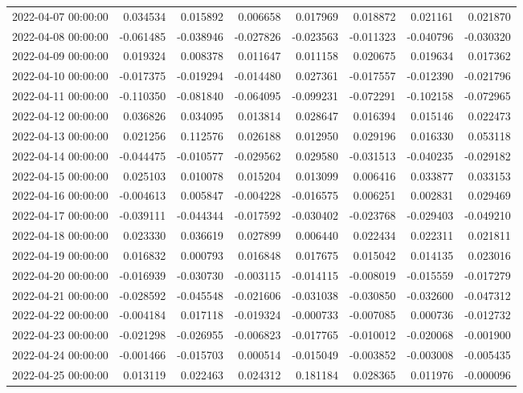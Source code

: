 \begin{tabular}{lrrrrrrr}
2022-04-07 00:00:00 & 0.034534 & 0.015892 & 0.006658 & 0.017969 & 0.018872 & 0.021161 & 0.021870 \\
2022-04-08 00:00:00 & -0.061485 & -0.038946 & -0.027826 & -0.023563 & -0.011323 & -0.040796 & -0.030320 \\
2022-04-09 00:00:00 & 0.019324 & 0.008378 & 0.011647 & 0.011158 & 0.020675 & 0.019634 & 0.017362 \\
2022-04-10 00:00:00 & -0.017375 & -0.019294 & -0.014480 & 0.027361 & -0.017557 & -0.012390 & -0.021796 \\
2022-04-11 00:00:00 & -0.110350 & -0.081840 & -0.064095 & -0.099231 & -0.072291 & -0.102158 & -0.072965 \\
2022-04-12 00:00:00 & 0.036826 & 0.034095 & 0.013814 & 0.028647 & 0.016394 & 0.015146 & 0.022473 \\
2022-04-13 00:00:00 & 0.021256 & 0.112576 & 0.026188 & 0.012950 & 0.029196 & 0.016330 & 0.053118 \\
2022-04-14 00:00:00 & -0.044475 & -0.010577 & -0.029562 & 0.029580 & -0.031513 & -0.040235 & -0.029182 \\
2022-04-15 00:00:00 & 0.025103 & 0.010078 & 0.015204 & 0.013099 & 0.006416 & 0.033877 & 0.033153 \\
2022-04-16 00:00:00 & -0.004613 & 0.005847 & -0.004228 & -0.016575 & 0.006251 & 0.002831 & 0.029469 \\
2022-04-17 00:00:00 & -0.039111 & -0.044344 & -0.017592 & -0.030402 & -0.023768 & -0.029403 & -0.049210 \\
2022-04-18 00:00:00 & 0.023330 & 0.036619 & 0.027899 & 0.006440 & 0.022434 & 0.022311 & 0.021811 \\
2022-04-19 00:00:00 & 0.016832 & 0.000793 & 0.016848 & 0.017675 & 0.015042 & 0.014135 & 0.023016 \\
2022-04-20 00:00:00 & -0.016939 & -0.030730 & -0.003115 & -0.014115 & -0.008019 & -0.015559 & -0.017279 \\
2022-04-21 00:00:00 & -0.028592 & -0.045548 & -0.021606 & -0.031038 & -0.030850 & -0.032600 & -0.047312 \\
2022-04-22 00:00:00 & -0.004184 & 0.017118 & -0.019324 & -0.000733 & -0.007085 & 0.000736 & -0.012732 \\
2022-04-23 00:00:00 & -0.021298 & -0.026955 & -0.006823 & -0.017765 & -0.010012 & -0.020068 & -0.001900 \\
2022-04-24 00:00:00 & -0.001466 & -0.015703 & 0.000514 & -0.015049 & -0.003852 & -0.003008 & -0.005435 \\
2022-04-25 00:00:00 & 0.013119 & 0.022463 & 0.024312 & 0.181184 & 0.028365 & 0.011976 & -0.000096 \\

\end{tabular}
